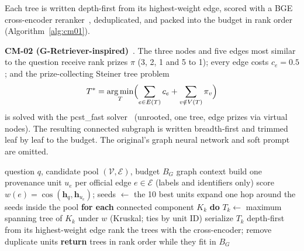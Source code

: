 \documentclass[conference]{IEEEtran}
\begin{document}
Each tree is written depth-first from its highest-weight edge, scored with a BGE cross-encoder reranker~\cite{xiao2024cpack}, deduplicated, and packed into the budget in rank order (Algorithm~\ref{alg:cm01}).

\textbf{CM-02 (G-Retriever-inspired)}~\cite{he2024gretriever}. The three nodes and five edges most similar to the question receive rank prizes $\pi$ (3, 2, 1 and 5 to 1); every edge costs $c_e=0.5$; and the prize-collecting Steiner tree problem~\cite{goemans1995}
\begin{equation}
T^*=\operatorname*{arg\,min}_{T}\Bigl(\sum_{e\in E(T)} c_e+\sum_{v\notin V(T)}\pi_v\Bigr)
\label{eq:pcst}
\end{equation}
is solved with the pcst\_fast solver~\cite{hegde2015pcst} (unrooted, one tree, edge prizes via virtual nodes). The resulting connected subgraph is written breadth-first and trimmed leaf by leaf to the budget. The original's graph neural network and soft prompt are omitted.

\begin{algorithm}[!t]
\caption{CM-01 graph-native KG\textsuperscript{2}RAG context construction}
\label{alg:cm01}
\begin{algorithmic}[1]
\Require question $q$, candidate pool $(\mathcal{V},\mathcal{E})$, budget $B_G$
\Ensure graph context
\State build one provenance unit $u_e$ per official edge $e\in \mathcal{E}$ (labels and identifiers only)
\State score $w(e)=\cos(\mathbf{h}_q,\mathbf{h}_{u_e})$; seeds $\leftarrow$ the 10 best units
\State expand one hop around the seeds inside the pool
\State \textbf{for each} connected component $K_k$ \textbf{do}
\State \hspace*{1\algorithmicindent}$T_k\leftarrow$ maximum spanning tree of $K_k$ under $w$ (Kruskal; ties by unit ID)
\State \hspace*{1\algorithmicindent}serialize $T_k$ depth-first from its highest-weight edge
\State rank the trees with the cross-encoder; remove duplicate units
\State \textbf{return} trees in rank order while they fit in $B_G$
\end{algorithmic}
\end{algorithm}
\end{document}
